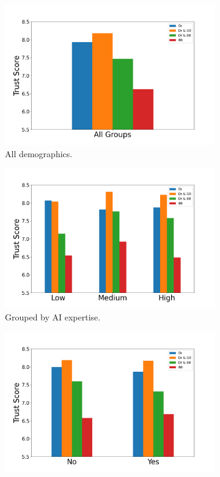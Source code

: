 \documentclass[manuscript,screen,review]{acmart}
\begin{document}
\begin{figure}[ht]
  \begin{subfigure}[t]{.45\textwidth}
    \centering
    \includegraphics[width=\linewidth]{graphics/survey_averages/survey_average.png}
    \caption{All demographics.}
  \end{subfigure}
  \begin{subfigure}[t]{.45\textwidth}
    \centering
    \includegraphics[width=\linewidth]{graphics/survey_averages/survey_AI_grouped.png}
    \caption{Grouped by AI expertise.}
  \end{subfigure}
  \medskip
  \begin{subfigure}[t]{.45\textwidth}
    \centering
    \includegraphics[width=\linewidth]{graphics/survey_averages/survey_medics_grouped.png}

\end{subfigure}
\end{figure}
\end{document}
